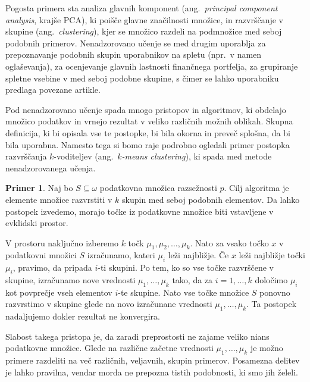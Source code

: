 \documentclass[12pt,a4paper,twoside]{article}
\theoremstyle{definition} %
\newtheorem{primer}[definicija]{Primer}
\theoremstyle{plain} %
\numberwithin{equation}{section}  %
\begin{document}
Pogosta primera sta analiza glavnih komponent (ang.~\textsl{principal component analysis}, krajše PCA), ki poišče glavne značilnosti množice, 
in razvrščanje v skupine (ang.~\textsl{clustering}), kjer se množico razdeli na podmnožice med seboj podobnih primerov. 
Nenadzorovano učenje se med drugim uporablja za prepoznavanje podobnih skupin uporabnikov na spletu (npr.\ v namen oglaševanja), 
za ocenjevanje glavnih lastnosti finančnega portfelja, za grupiranje spletne vsebine v med seboj podobne skupine, s čimer se lahko uporabniku predlaga povezane artikle.

Pod nenadzorovano učenje spada mnogo pristopov in algoritmov, ki obdelajo množico podatkov in vrnejo rezultat v veliko različnih možnih oblikah. 
Skupna definicija, ki bi opisala vse te postopke, bi bila okorna in preveč splošna, da bi bila uporabna. 
Namesto tega si bomo raje podrobno ogledali primer postopka razvrščanja $k$-voditeljev (ang.~\textsl{$k$-means clustering}), ki spada med metode nenadzorovanega učenja.

\begin{primer}
Naj bo $S \subseteq \omega$ podatkovna množica razsežnosti $p$. 
Cilj algoritma je elemente množice razvrstiti v $k$ skupin med seboj podobnih elementov.
Da lahko postopek izvedemo, morajo točke iz podatkovne množice biti vstavljene v evklidski prostor.

V prostoru naključno izberemo $k$ točk $\mu_1, \mu_2, \ldots , \mu_k$. 
Nato za vsako točko $x$ v podatkovni množici $S$ izračunamo, kateri $\mu_i$ leži najbližje. Če $x$ leži najbližje točki $\mu_i$, pravimo, da pripada $i$-ti skupini. 
Po tem, ko so vse točke razvrščene v skupine, izračunamo nove vrednosti $\mu_1, \ldots , \mu_k$ tako, da za $i=1,\ldots,k$ določimo $\mu_i$ kot povprečje vseh elementov $i$-te skupine. 
Nato vse točke množice $S$ ponovno razvrstimo v skupine glede na novo izračunane vrednosti $\mu_1, \ldots, \mu_k$.
Ta postopek nadaljujemo dokler rezultat ne konvergira. 

Slabost takega pristopa je, da zaradi preprostosti ne zajame veliko nians podatkovne množice. 
Glede na različne začetne vrednosti $\mu_1, \ldots, \mu_k$ je možno primere razdeliti na več različnih, veljavnih, skupin primerov. 
Posamezna delitev je lahko pravilna, vendar morda ne prepozna tistih podobnosti, ki smo jih želeli.
\end{primer}
\end{document}
